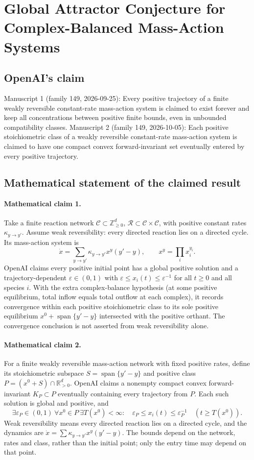 \documentclass[11pt]{article}
\begin{document}
\section*{Global Attractor Conjecture for Complex-Balanced Mass-Action Systems}

\subsection{OpenAI's claim}
Manuscript 1 (family 149, 2026-09-25): Every positive trajectory of a finite weakly reversible constant-rate mass-action system is claimed to exist forever and keep all concentrations between positive finite bounds, even in unbounded compatibility classes. Manuscript 2 (family 149, 2026-10-05): Each positive stoichiometric class of a weakly reversible constant-rate mass-action system is claimed to have one compact convex forward-invariant set eventually entered by every positive trajectory.

\subsection{Mathematical statement of the claimed result}
\paragraph{Mathematical claim 1.} Take a finite reaction network $\mathcal C\subset\mathbb Z_{\ge0}^d$, $\mathcal R\subset\mathcal C\times\mathcal C$, with positive constant rates $\kappa_{y\to y'}$. Assume weak reversibility: every directed reaction lies on a directed cycle. Its mass-action system is
\[
\dot x=\sum_{y\to y'}\kappa_{y\to y'}x^y(y'-y),\qquad x^y=\prod_i x_i^{y_i}.
\]
OpenAI claims every positive initial point has a global positive solution and a trajectory-dependent $\varepsilon\in(0,1)$ with $\varepsilon\le x_i(t)\le\varepsilon^{-1}$ for all $t\ge0$ and all species $i$.
With the extra complex-balance hypothesis (at some positive equilibrium, total inflow equals total outflow at each complex), it records convergence within each positive stoichiometric class to its sole positive equilibrium $x^0+\operatorname{span}\{y'-y\}$ intersected with the positive orthant. The convergence conclusion is not asserted from weak reversibility alone.

\paragraph{Mathematical claim 2.} For a finite weakly reversible mass-action network with fixed positive rates, define its stoichiometric subspace $S=\operatorname{span}\{y'-y\}$ and positive class $P=(x^0+S)\cap\mathbb R_{>0}^d$. OpenAI claims a nonempty compact convex forward-invariant $K_P\subset P$ eventually containing every trajectory from $P$. Each such solution is global and positive, and
\[
\exists\varepsilon_P\in(0,1)\ \forall x^0\in P\ \exists T(x^0)<\infty:\quad
\varepsilon_P\le x_i(t)\le\varepsilon_P^{-1}\quad(t\ge T(x^0)).
\]
Weak reversibility means every directed reaction lies on a directed cycle, and the dynamics are $\dot x=\sum\kappa_{y\to y'}x^y(y'-y)$. The bounds depend on the network, rates and class, rather than the initial point; only the entry time may depend on that point.
\end{document}
